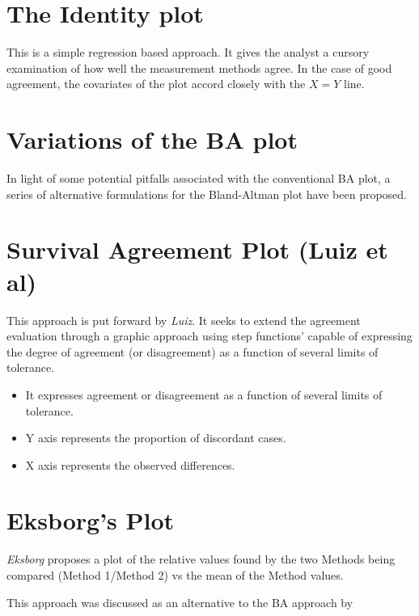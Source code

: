 \documentclass[Chap2bmain.tex]{subfiles}
\begin{document}
\section{The Identity plot} This is a simple regression based approach. It gives the analyst a cursory examination of how well the measurement methods agree. In the case of good agreement, the covariates of the plot accord closely with the $X=Y$ line.

\section{Variations of the BA plot}

In light of some potential pitfalls associated with the conventional BA plot, a series of alternative formulations for the Bland-Altman plot have been proposed.



\section{Survival Agreement Plot (Luiz et al)}
This approach is put forward by \textit{Luiz}. It seeks to extend the agreement evaluation through a graphic approach using step functions' capable of expressing the degree of agreement (or disagreement) as a function of several limits of tolerance.

\begin{itemize}
\item It expresses agreement or disagreement as a function of several
limits of tolerance.
\item Y axis represents the proportion of discordant cases.
\item X axis represents the observed differences.
\end{itemize}

\section{Eksborg's Plot}
\textit{Eksborg} proposes a plot of the relative values found by the two
Methods being compared (Method 1/Method 2) vs the mean of the Method
values.

This approach was discussed as an alternative to the BA approach by 
\newpage
\end{document}
